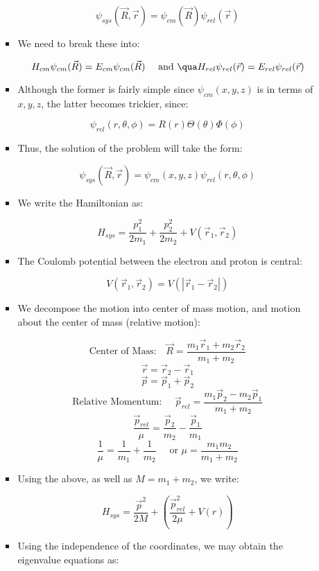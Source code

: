 \begin{itemize}
\begin{itemize}
\begin{itemize}
            $$\psi_{sys}(\vec{R},\vec{r})=\psi_{cm}(\vec{R})\psi_{rel}(\vec{r})$$

          \item We need to break these into:

            $$H_{cm}\psi_{cm}(\vec{R})=E_{cm}\psi_{cm}(\vec{R})\quad\text{ and }\qua H_{rel}\psi_{rel}(\vec{r})=E_{rel}\psi_{rel}(\vec{r})$$

          \item Although the former is fairly simple since $\psi_{cm}(x,y,z)$ is in terms of $x,y,z$, the latter becomes trickier, since:

            $$\psi_{rel}(r,\theta,\phi)=R(r)\Theta(\theta)\Phi(\phi)$$

          \item Thus, the solution of the problem will take the form:

            $$\psi_{sys}(\vec{R},\vec{r})=\psi_{cm}(x,y,z)\psi_{rel}(r,\theta,\phi)$$

          \item We write the Hamiltonian as:

            $$H_{sys}=\frac{p_1^2}{2m_1}+\frac{p_2^2}{2m_2}+V(\vec{r}_1,\vec{r}_2)$$

          \item The Coulomb potential between the electron and proton is central:

            $$V(\vec{r}_1,\vec{r}_2)=V(|\vec{r}_1-\vec{r}_2|)$$

          \item We decompose the motion into center of mass motion, and motion about the center of mass (relative motion):

              $$\text{Center of Mass:}\quad \vec{R}=\frac{m_1\vec{r}_1+m_2\vec{r}_2}{m_1+m_2}$$
              $$\vec{r}=\vec{r}_2-\vec{r}_1$$
              $$\vec{p}=\vec{p}_1+\vec{p}_2$$
              $$\text{Relative Momentum: }\quad \vec{p}_{rel}=\frac{m_1\vec{p}_2-m_2\vec{p}_1}{m_1+m_2}$$
              $$\frac{\vec{p}_{rel}}{\mu}=\frac{\vec{p}_2}{m_2}-\frac{\vec{p}_1}{m_1}$$
              $$\frac{1}{\mu}=\frac{1}{m_1}+\frac{1}{m_2}\quad\text{ or }\mu=\frac{m_1m_2}{m_1+m_2}$$

            \item Using the above, as well as $M=m_1+m_2$, we write:

              $$H_{sys}=\frac{\vec{p}^2}{2M}+\left( \frac{\vec{p}_{rel}^2}{2\mu}+V(r) \right)$$

            \item Using the independence of the coordinates, we may obtain the eigenvalue equations as:


\end{itemize}
\end{itemize}
\end{itemize}
